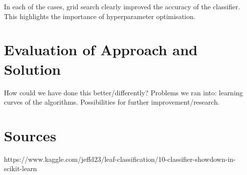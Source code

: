 \documentclass{article}
\begin{document}
In each of the cases, grid search clearly improved the accuracy of the classifier. This highlights the importance of hyperparameter optimisation. 
\section{Evaluation of Approach and Solution} 
	How could we have done this better/differently?
	Problems we ran into: learning curves of the algorithms.
	Possibilities for further improvement/research.
	





\section{Sources}


https://www.kaggle.com/jeffd23/leaf-classification/10-classifier-showdown-in-scikit-learn
\end{document}
